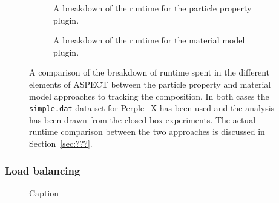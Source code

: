 \begin{figure}
    \centering
    \begin{subfigure}{0.49\columnwidth}
        \centering
        \caption{A breakdown of the runtime for the particle property plugin.}
        \label{fig:perf_batch_pie}
    \end{subfigure}
    \hfill
    \begin{subfigure}{0.49\columnwidth}
        \centering
        \caption{A breakdown of the runtime for the material model plugin.}
        \label{fig:perf_2pp_pie}
    \end{subfigure}
    \caption{
        A comparison of the breakdown of runtime spent in the different elements of ASPECT between the particle property and material model approaches to tracking the composition.
        In both cases the \texttt{simple.dat} data set for Perple\_X has been used and the analysis has been drawn from the closed box experiments.
        The actual runtime comparison between the two approaches is discussed in Section~\ref{sec:???}.
    }
    \label{fig:perf_pie}
\end{figure}

\subsubsection{Load balancing}

\begin{figure}
    \centering
    
    \caption{Caption}
    \label{fig:load_balancing}
\end{figure}